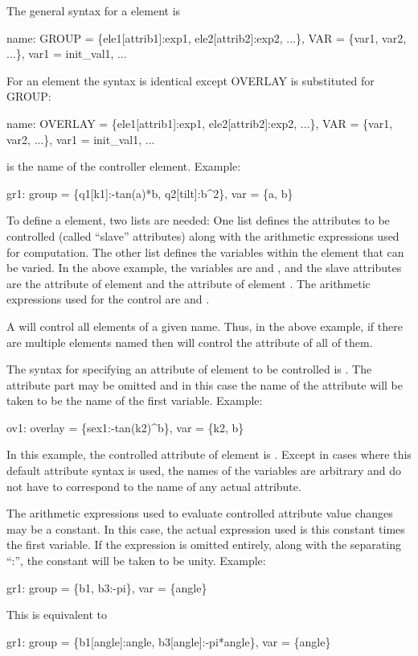 The general syntax for a  element is
\begin{example}
  name: GROUP = \{ele1[attrib1]:exp1, ele2[attrib2]:exp2, ...\}, 
                 VAR = \{var1, var2, ...\}, var1 = init_val1, ...
\end{example}
For an  element the syntax is identical except OVERLAY is
substituted for GROUP:
\begin{example}
  name: OVERLAY = \{ele1[attrib1]:exp1, ele2[attrib2]:exp2, ...\}, 
                 VAR = \{var1, var2, ...\}, var1 = init_val1, ...
\end{example}
 is the name of the controller element. Example:
\begin{example}
  gr1: group = \{q1[k1]:-tan(a)*b, q2[tilt]:b^2\}, var = \{a, b\}
\end{example}

To define a  element, two lists are needed: One list defines
the attributes to be controlled (called ``slave'' attributes) along
with the arithmetic expressions used for computation. The other list
defines the variables within the  element that can be
varied. In the above example, the variables are  and , and
the slave attributes are the  attribute of element 
and the  attribute of element . The arithmetic
expressions used for the control are  and .

A  will control all elements of a given name. Thus, in
the above example, if there are multiple elements named 
then  will control the   attribute of all of them.

The syntax for specifying an attribute  of element 
to be controlled is . The attribute part \vn{[attrib]}
may be omitted and in this case the name of the attribute will be
taken to be the name of the first variable. Example:
\begin{example}
  ov1: overlay = \{sex1:-tan(k2)^b\}, var = \{k2, b\}
\end{example}
In this example, the controlled attribute of element  is
.  Except in cases where this default attribute syntax is used,
the names of the variables are arbitrary and do not have to correspond
to the name of any actual attribute.

The arithmetic expressions used to evaluate controlled attribute value
changes may be a constant. In this case, the actual expression used is
this constant times the first variable. If the expression is omitted
entirely, along with the separating ``:'', the constant will be taken
to be unity. Example:
\begin{example}
  gr1: group = \{b1, b3:-pi\}, var = \{angle\}
\end{example}
This is equivalent to
\begin{example}
  gr1: group = \{b1[angle]:angle, b3[angle]:-pi*angle\}, var = \{angle\}
\end{example}

